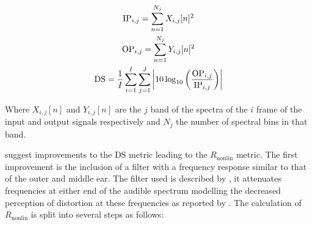 			\begin{gather}
				\mathrm{IP}_{i,j} = \sum_{n = 1}^{N_{j}} X_{i,j}[n]^2 \nonumber \\
				\mathrm{OP}_{i,j} = \sum_{n = 1}^{N_{j}} Y_{i,j}[n]^2 \nonumber \\
				\mathrm{DS} = \frac{1}{I} \sum_{i = 1}^{I} \sum_{j = 1}^{J} 
					\left|10\log_{10} \left( \frac{\mathrm{OP}_{i,j}}{\mathrm{IP}_{i,j}} \right) \right|
				\label{eq:DistortionScore}
			\end{gather}

			Where $X_{i,j}[n]$ and $Y_{i,j}[n]$ are the $j$ band of the spectra of the $i$
			frame of the input and output signals respectively and $N_{j}$ the number of spectral bins in that
			band.
			
			\citet{tan2004predicting} suggest improvements to the $\mathrm{DS}$ metric leading to the
			$R_{\mathrm{nonlin}}$ metric. The first improvement is the inclusion of a filter with a frequency
			response similar to that of the outer and middle ear. The filter used is described by
			\citet{glasberg2002a}, it attenuates frequencies at either end of the audible spectrum modelling the
			decreased perception of distortion at these frequencies as reported by
			\citet{voishvillo2006assessment}. The calculation of $R_{\mathrm{nonlin}}$ is split into several
			steps as follows:
			
